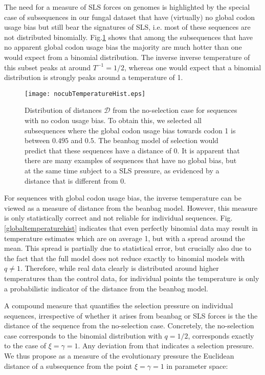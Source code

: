 \documentclass[a4paper,10pt]{paper}%
\begin{document}
The need for a measure of SLS forces on genomes is highlighted by  the  special case of subsequences in our fungal dataset that have (virtually) no global codon usage bias but still bear the signatures of SLS, i.e. most of these sequences  are not distributed binomially.   Fig.\ref{nocubtemperaturehist}  shows that among the subsequences that have no apparent global codon usage bias the majority  are much hotter than one would expect from a binomial distribution. The inverse  inverse temperature  of this subset peaks at around $T^{-1} =1/2$, whereas one would expect that a binomial distribution is strongly peaks around a temperature of 1.  
\par
%
%
\begin{figure}
\centering
\texttt{[image: nocubTemperatureHist.eps]}
\caption{Distribution of distances $\mathcal D$ from the no-selection case  for sequences with no codon usage bias. To obtain this, we selected all subsequences where the global codon usage bias  towards codon 1 is  between $0.495$ and $0.5$. The beanbag model of selection would predict that these sequences have a distance of 0. It is apparent that there are many examples of sequences that have no global bias, but at the same time subject to a SLS pressure, as evidenced by a distance that is different from 0.}
\label{nocubtemperaturehist}
\end{figure}
%
%
\par
For  sequences with global codon usage bias, the inverse temperature can be viewed as a measure of distance from the beanbag model. However, this measure is only statistically correct and not reliable for individual sequences. Fig. \ref{globaltemperaturehist}  indicates that even perfectly binomial data may result in temperature estimates which are on average 1, but with a spread around the mean. This spread is partially due to statistical error, but crucially also due to the  fact that the full model does not reduce exactly to binomial models with $q\neq 1$. Therefore, while  real data clearly  is distributed around higher temperatures than the control data, for individual points the temperature is only a probabilistic indicator of the distance from the beanbag model.
\par
A compound  measure that quantifies  the selection pressure on individual sequences, irrespective of whether it arises from beanbag or SLS forces is the the distance  of the sequence from the no-selection case. Concretely, the no-selection case corresponds to the  binomial distribution with $q=1/2$, corresponds exactly to the case of $\xi=\gamma=1$. Any deviation from that indicates a selection pressure.  We thus propose as a measure of the evolutionary pressure the Euclidean distance of a subsequence from the point $\xi=\gamma=1$ in parameter space: 
\end{document}
